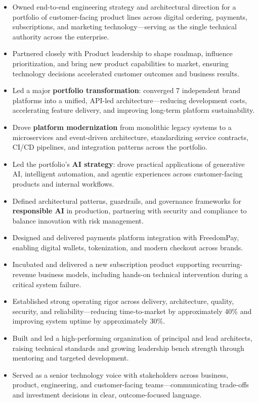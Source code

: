 \documentclass[11pt]{article}
\begin{document}
\begin{itemize}
  \item Owned end-to-end engineering strategy and architectural direction for a portfolio of customer-facing product lines across digital ordering, payments, subscriptions, and marketing technology---serving as the single technical authority across the enterprise.
  \item Partnered closely with Product leadership to shape roadmap, influence prioritization, and bring new product capabilities to market, ensuring technology decisions accelerated customer outcomes and business results.
  \item Led a major \textbf{portfolio transformation}: converged 7 independent brand platforms into a unified, API-led architecture---reducing development costs, accelerating feature delivery, and improving long-term platform sustainability.
  \item Drove \textbf{platform modernization} from monolithic legacy systems to a microservices and event-driven architecture, standardizing service contracts, CI/CD pipelines, and integration patterns across the portfolio.
  \item Led the portfolio's \textbf{AI strategy}: drove practical applications of generative AI, intelligent automation, and agentic experiences across customer-facing products and internal workflows.
  \item Defined architectural patterns, guardrails, and governance frameworks for \textbf{responsible AI} in production, partnering with security and compliance to balance innovation with risk management.
  \item Designed and delivered payments platform integration with FreedomPay, enabling digital wallets, tokenization, and modern checkout across brands.
  \item Incubated and delivered a new subscription product supporting recurring-revenue business models, including hands-on technical intervention during a critical system failure.
  \item Established strong operating rigor across delivery, architecture, quality, security, and reliability---reducing time-to-market by approximately 40\% and improving system uptime by approximately 30\%.
  \item Built and led a high-performing organization of principal and lead architects, raising technical standards and growing leadership bench strength through mentoring and targeted development.
  \item Served as a senior technology voice with stakeholders across business, product, engineering, and customer-facing teams---communicating trade-offs and investment decisions in clear, outcome-focused language.
\end{itemize}
\end{document}
